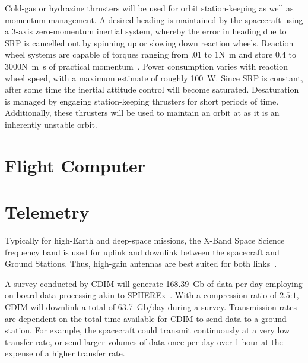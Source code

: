 \documentclass{ws-jai}
\begin{document}
Cold-gas or hydrazine thrusters will be used for orbit station-keeping as well as momentum management.
A desired heading is maintained by the spacecraft using a 3-axis zero-momentum inertial system, whereby the error in heading due to SRP is cancelled out by spinning up or slowing down reaction wheels.
Reaction wheel systems are capable of torques ranging from $.01$ to $1$\si{\newton\meter} and store $0.4$ to $3000$\si{\newton\meter\second} of practical momentum~\cite{smad2015}.
Power consumption varies with reaction wheel speed, with a maximum estimate of roughly \SI{100}{\watt}.
Since SRP is constant, after some time the inertial attitude control will become saturated.
Desaturation is managed by engaging station-keeping thrusters for short periods of time.
Additionally, these thrusters will be used to maintain an orbit at \Ltwo{} as it is an inherently unstable orbit.

\section{Flight Computer}

\section{Telemetry}
\label{sec:telemetry}
Typically for high-Earth and deep-space missions, the X-Band Space Science frequency band is used for uplink and downlink between the spacecraft and Ground Stations.
Thus, high-gain antennas are best suited for both links~\cite{smad2015}.

A survey conducted by CDIM will generate \SI{168.39}{Gb} of data per day employing on-board data processing akin to SPHEREx~\cite{spherexTelemetry2016}.
With a compression ratio of $2.5$:$1$, CDIM will downlink a total of \SI{63.7}{Gb/day} during a survey.
Transmission rates are dependent on the total time available for CDIM to send data to a ground station.
For example, the spacecraft could transmit continuously at a very low transfer rate, or send larger volumes of data once per day over 1 hour at the expense of a higher transfer rate.
\end{document}
